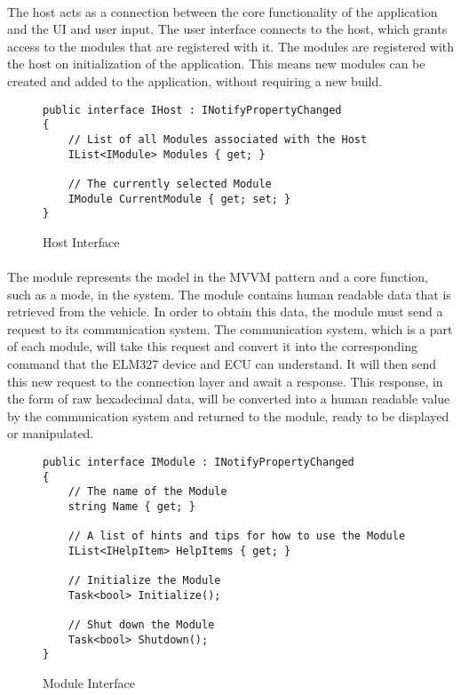 	\paragraph{}{
	The host acts as a connection between the core functionality of the application and the UI and user input. The user interface connects to the host, which grants access to the modules that are registered with it. The modules are registered with the host on initialization of the application. This means new modules can be created and added to the application, without requiring a new build.
	}
		
	\begin{figure}[h]
		\begin{lstlisting}
public interface IHost : INotifyPropertyChanged
{
	// List of all Modules associated with the Host
	IList<IModule> Modules { get; }
	
	// The currently selected Module
	IModule CurrentModule { get; set; }
}
		\end{lstlisting}
		\caption{Host Interface}
		\label{code:HostInterface}
	\end{figure}
	
	\paragraph{}{
	The module represents the model in the MVVM pattern and a core function, such as a mode, in the system. The module contains human readable data that is retrieved from the vehicle. In order to obtain this data, the module must send a request to its communication system. The communication system, which is a part of each module, will take this request and convert it into the corresponding command that the ELM327 device and ECU can understand. It will then send this new request to the connection layer and await a response. This response, in the form of raw hexadecimal data, will be converted into a human readable value by the communication system and returned to the module, ready to be displayed or manipulated.
	}
	\begin{figure}[h]
		\begin{lstlisting}
public interface IModule : INotifyPropertyChanged
{
	// The name of the Module
	string Name { get; }
	
	// A list of hints and tips for how to use the Module
	IList<IHelpItem> HelpItems { get; }

	// Initialize the Module
	Task<bool> Initialize();

	// Shut down the Module
	Task<bool> Shutdown(); 
}
		\end{lstlisting}
		\caption{Module Interface}
		\label{code:ModuleInterface}
	\end{figure}
	
